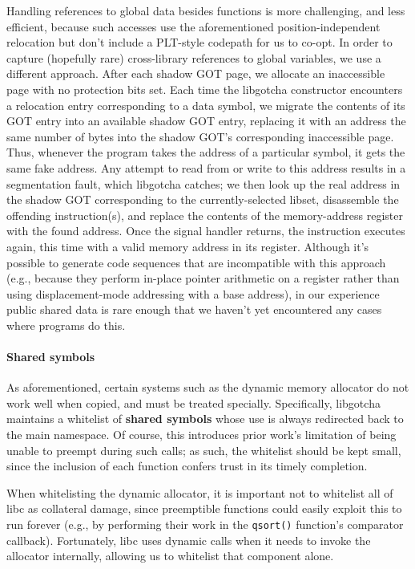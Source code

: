 Handling references to global data besides functions is more challenging, and less
efficient, because such accesses use the aforementioned position-independent
relocation but don't include a PLT-style codepath for us to co-opt.
In order to capture (hopefully rare) cross-library references to global variables,
we use a different approach.  After each shadow GOT page, we allocate an inaccessible
page with no protection bits set.  Each time the libgotcha constructor encounters a
relocation entry corresponding to a data symbol, we migrate the contents of its GOT
entry into an available shadow GOT entry, replacing it with an address the same
number of bytes into the shadow GOT's corresponding inaccessible page.  Thus,
whenever the program takes the address of a particular symbol, it gets the same fake
address.  Any attempt to read from or write to this address results in a segmentation
fault, which libgotcha catches; we then look up the real address in the shadow GOT
corresponding to the currently-selected libset, disassemble the offending
instruction(s), and replace the contents of the memory-address register with the
found address.  Once the signal handler returns, the instruction executes again, this
time with a valid memory address in its register.  Although it's possible to generate
code sequences that are incompatible with this approach (e.g., because they perform
in-place pointer arithmetic on a register rather than using displacement-mode
addressing with a base address), in our experience public shared data is rare enough
that we haven't yet encountered any cases where programs do this.

\paragraph{Shared symbols}

As aforementioned, certain systems such as the dynamic memory allocator do not work
well when copied, and must be treated specially.  Specifically, libgotcha maintains
a whitelist of \textbf{shared symbols} whose use is always redirected back to the
main namespace.  Of course, this introduces prior work's limitation of being unable
to preempt during such calls; as such, the whitelist should be kept small, since the
inclusion of each function confers trust in its timely completion.

When whitelisting the dynamic allocator, it is important not to whitelist all of libc
as collateral damage,
since preemptible functions could easily exploit this to run forever (e.g., by
performing their work in the \texttt{qsort()} function's comparator callback).
Fortunately, libc uses dynamic calls when it needs to invoke the allocator
internally, allowing us to whitelist that component alone.

